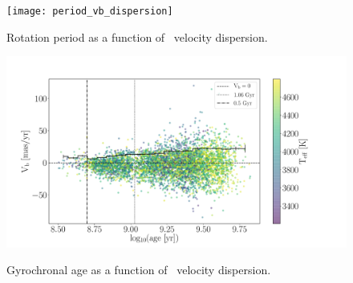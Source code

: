 \begin{figure}
  \caption{
Rotation period as a function of \vb\ velocity dispersion.
}
  \centering
    \texttt{[image: period\_vb\_dispersion]}
\label{fig:period_vb_dispersion}
\end{figure}

\begin{figure}
  \caption{
Gyrochronal age as a function of \vb\ velocity dispersion.
}
  \centering
    \includegraphics[width=1\textwidth]{age_vb_dispersion}
\label{fig:age_vb_dispersion}
\end{figure}
